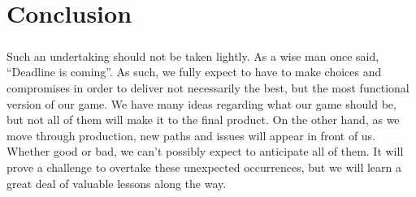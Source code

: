

\chapter{Conclusion}

\paragraph{}Such an undertaking should not be taken lightly. As a wise man once said, “Deadline is coming”. As such, we fully expect to have to make choices and compromises in order to deliver not necessarily the best, but the most functional version of our game. We have many ideas regarding what our game should be, but not all of them will make it to the final product. On the other hand, as we move through production, new paths and issues will appear in front of us. Whether good or bad, we can’t possibly expect to anticipate all of them. It will prove a challenge to overtake these unexpected occurrences, but we will learn a great deal of valuable lessons along the way.



